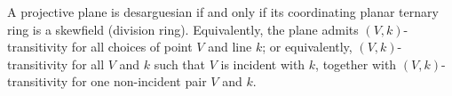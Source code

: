 A projective plane is desarguesian if and only if its coordinating planar ternary ring is a skewfield (division ring). Equivalently, the plane admits $(V,k)$-transitivity for all choices of point $V$ and line $k$; or equivalently, $(V,k)$-transitivity for all $V$ and $k$ such that $V$ is incident with $k$, together with $(V,k)$-transitivity for one non-incident pair $V$ and $k$.

